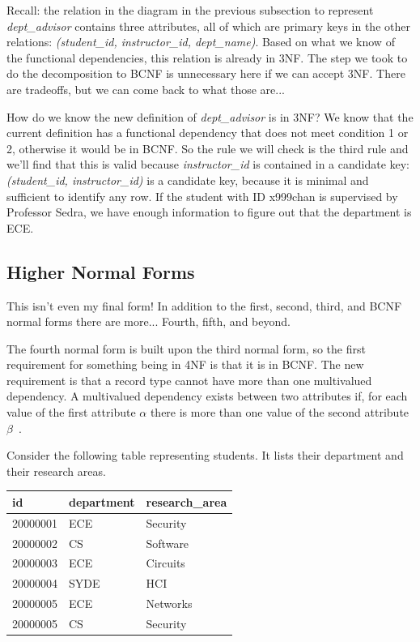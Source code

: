 Recall: the relation in the diagram in the previous subsection to represent \textit{dept\_advisor} contains three attributes, all of which are primary keys in the other relations: \textit{(student\_id, instructor\_id, dept\_name)}. Based on what we know of the functional dependencies, this relation is already in 3NF. The step we took to do the decomposition to BCNF is unnecessary here if we can accept 3NF. There are tradeoffs, but we can come back to what those are...

How do we know the new definition of \textit{dept\_advisor} is in 3NF? We know that the current definition has a functional dependency that does not meet condition 1 or 2, otherwise it would be in BCNF. So the rule we will check is the third rule and we'll find that this is valid because \textit{instructor\_id} is contained in a candidate key: \textit{(student\_id, instructor\_id)} is a candidate key, because it is minimal and sufficient to identify any row. If the student with ID x999chan is supervised by Professor Sedra, we have enough information to figure out that the department is ECE.

\subsection*{Higher Normal Forms}
This isn't even my final form! In addition to the first, second, third, and BCNF normal forms there are more... Fourth, fifth, and beyond. 

The fourth normal form is built upon the third normal form, so the first requirement for something being in 4NF is that it is in BCNF. The new requirement is that a record type cannot have more than one multivalued dependency. A multivalued dependency exists between two attributes if, for each value of the first attribute $\alpha$ there is more than one value of the second attribute $\beta$~\cite{fournorm}. 

Consider the following table representing students. It lists their department and their research areas. 

\begin{center}
\begin{tabular}{|l|l|l|} \hline
	\textbf{id} & \textbf{department} & \textbf{research\_area} \\ \hline
	20000001 & ECE & Security \\ \hline
	20000002 & CS & Software \\ \hline
    20000003 & ECE & Circuits \\ \hline
    20000004 & SYDE & HCI \\ \hline
    20000005 & ECE & Networks \\ \hline
    20000005 & CS & Security \\ \hline
\end{tabular}
\end{center}


